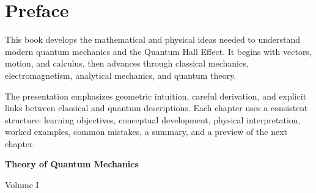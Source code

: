 \chapter*{Preface}

This book develops the mathematical and physical ideas needed to understand
modern quantum mechanics and the Quantum Hall Effect. It begins with vectors,
motion, and calculus, then advances through classical mechanics,
electromagnetism, analytical mechanics, and quantum theory.

The presentation emphasizes geometric intuition, careful derivation, and
explicit links between classical and quantum descriptions. Each chapter uses a
consistent structure: learning objectives, conceptual development, physical
interpretation, worked examples, common mistakes, a summary, and a preview of
the next chapter.

\clearpage

	

\frontmatter


\begin{titlepage}
	\centering
	\vspace*{\fill}
	
	{\Huge\bfseries Theory of Quantum Mechanics\par}
	
	\vspace{1cm}
	
	{\Large Volume I}
	
	\vspace*{\fill}
\end{titlepage}


